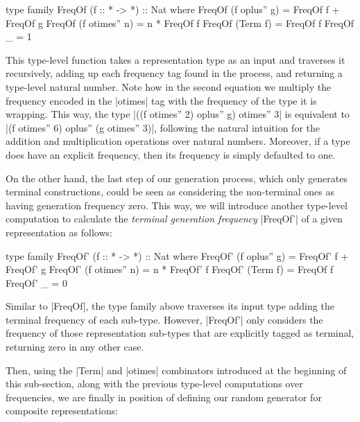 \begin{code}
type family FreqOf (f :: * -> *) :: Nat where
  FreqOf (f oplus'' g)   = FreqOf f + FreqOf g
  FreqOf (f otimes'' n)  = n * FreqOf f
  FreqOf (Term f)        = FreqOf f
  FreqOf _               = 1
\end{code}
%
This type-level function takes a representation type as an input and traverses
it recursively, adding up each frequency tag found in the process, and returning
a type-level natural number.
%
Note how in the second equation we multiply the frequency encoded in the
|otimes| tag with the frequency of the type it is wrapping.
%
This way, the type |((f otimes'' 2) oplus'' g) otimes'' 3| is equivalent to |(f
otimes'' 6) oplus'' (g otimes'' 3)|, following the natural intuition for the
addition and multiplication operations over natural numbers.
%
Moreover, if a type does have an explicit frequency, then its frequency is
simply defaulted to one.


On the other hand, the last step of our generation process, which only generates
terminal constructions, could be seen as considering the non-terminal ones as
having generation frequency zero.
%
This way, we will introduce another type-level computation to calculate the
\emph{terminal generation frequency} |FreqOf'| of a given representation as
follows:

\begin{code}
type family FreqOf' (f :: * -> *) :: Nat where
  FreqOf' (f oplus'' g)   = FreqOf' f  +  FreqOf' g
  FreqOf' (f otimes'' n)  = n  *  FreqOf' f
  FreqOf' (Term f)        = FreqOf f
  FreqOf' _               = 0
\end{code}
%
Similar to |FreqOf|, the type family above traverses its input type adding the
terminal frequency of each sub-type.
%
However, |FreqOf'| only considers the frequency of those representation
sub-types that are explicitly tagged as terminal, returning zero in any other
case.


Then, using the |Term| and |otimes| combinators introduced at the beginning of
this sub-section, along with the previous type-level computations over
frequencies, we are finally in position of defining our random generator for
composite representations:

